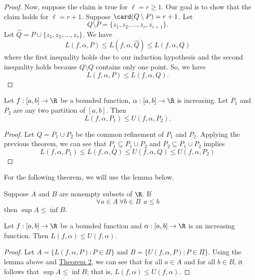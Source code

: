 \begin{proof}
Now, suppose the claim is true for \( \ell = r \geq 1  \). Our goal is to show that the claim holds for \( \ell = r + 1  \). Suppose \( \card (Q \setminus  P ) = r + 1  \). Let
\[  Q \setminus  P = \{  {z}_{1}, {z}_{2}, \dots, {z}_{r}, {z}_{r+1} \}.  \]
Let \( \hat{Q} = P \cup \{ {z}_{1}, {z}_{2}, \dots, {z}_{r} \}  \). We have
\[  L(f,\alpha, P) \leq L(f,\alpha, \hat{Q}) \leq L(f,\alpha, Q ) \]
where the first inequality holds due to our induction hypothesis and the second inequality holds because \( Q \setminus  \hat{Q}  \) contains only one point. So, we have 
\[  L(f,\alpha, P )  \leq L(f,\alpha, Q ).\]
\end{proof}

\begin{theorem}[ ]\label{Theorem 2}
    Let \( f:[a,b] \to \R  \) be a bounded function, \( \alpha: [a,b] \to \R  \) is increasing. Let \( {P}_{1} \) and \( {P}_{2} \) are any two partition of \( [a,b] \). Then 
    \[  L(f,\alpha, {P}_{1}) \leq U(f,\alpha, {P}_{2}). \]
\end{theorem}
\begin{proof}
Let \( Q = {P}_{1} \cup {P}_{2} \) be the common refinement of \( {P}_{1} \) and \( {P}_{2} \). Applying the previous theorem, we can see that \( {P}_{1} \subseteq  {P}_{1} \cup {P}_{2} \) and \( {P}_{2} \subseteq {P}_{1} \cup {P}_{2}   \) implies
\[  L(f,\alpha, {P}_{1}) \leq L(f,\alpha, Q ) \leq U(f,\alpha, Q ) \leq U(f,\alpha, {P}_{2}) \]
\end{proof}

For the following theorem, we will use the lemma below.

\begin{lemma}
    Suppose \( A  \) and \( B  \) are nonempty subsets of \( \R  \). If 
    \[  \forall a \in A \ \forall b \in B \ \ a \leq b  \]
    then \( \sup A \leq \inf B  \).
\end{lemma}

\begin{theorem}[Rudin 6.5]
    Let \( f: [a,b] \to \R  \) be a bounded function and \( \alpha: [a,b] \to \R  \) is an increasing function. Then \( L(f,\alpha) \leq U(f,\alpha) \). 
\end{theorem}
\begin{proof}
Let \( A = \{  L(f,\alpha, P) : P \in \Pi \}  \) and \( B = \{  U(f,\alpha, P) : P \in \Pi \}  \). Using the lemma above and {\hyperref[Theorem 2]{Theorem 2}}, we can see that for all \( a \in A  \) and for all \( b \in B  \), it follows that \( \sup A \leq \inf B  \); that is, \( L(f,\alpha) \leq U(f,\alpha) \).
\end{proof}

